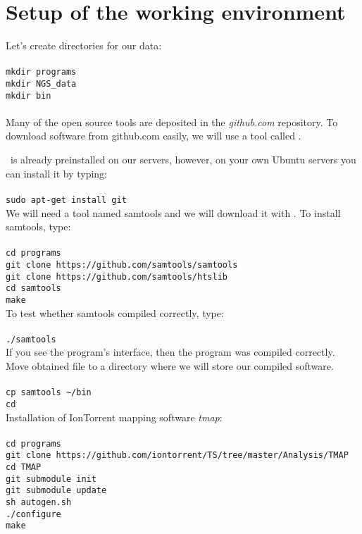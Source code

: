 \section{Setup of the working environment}
Let's create directories for our data:\\~\\
\texttt{mkdir programs \\
mkdir NGS\_data \\
mkdir bin}\\~\\

Many of the open source tools are deposited in the \textit{github.com} repository.
To download software from github.com easily, we will use a tool called \git.

\Git~is already preinstalled on our servers, however, on your own Ubuntu servers
you can install it by typing:\\~\\
\texttt{sudo apt-get install git}\\

We will need a tool named samtools and we will download it with \git.
To install samtools, type:\\~\\
\texttt{cd programs}\\
\texttt{git clone https://github.com/samtools/samtools}\\
\texttt{git clone https://github.com/samtools/htslib}\\
\texttt{cd samtools}\\
\texttt{make}\\

To test whether samtools compiled correctly, type:\\~\\
\texttt{./samtools}\\

If you see the program's interface, then the program was compiled correctly.
Move obtained file to a directory where we will store our compiled software.\\~\\
\texttt{cp samtools \textasciitilde/bin\\
cd}\\

Installation of IonTorrent mapping software \textit{tmap}:\\~\\
\texttt{cd programs}\\
\texttt{git clone https://github.com/iontorrent/TS/tree/master/Analysis/TMAP}\\
\texttt{cd TMAP}\\
\texttt{git submodule init}\\
\texttt{git submodule update}\\
\texttt{sh autogen.sh}\\
\texttt{./configure}\\
\texttt{make}





